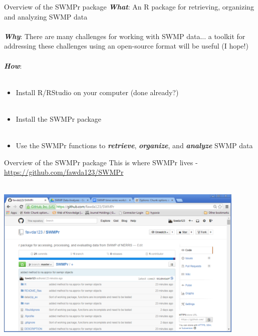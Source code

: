 \documentclass[xcolor=svgnames]{beamer}\usepackage[]{graphicx}\usepackage[]{color}
\newcommand{\Bigtxt}[1]{\textbf{\textit{#1}}}
\begin{document}
\begin{frame}{Overview of the SWMPr package}
\onslide<+->
\textbf{\emph{What}}: An R package for retrieving, organizing and analyzing SWMP data \\~\\
\onslide<+->
\Bigtxt{Why}: There are many challenges for working with SWMP data... a toolkit for addressing these challenges using an open-source format will be useful (I hope!) \\~\\
\onslide<+->
\Bigtxt{How}: \\~\\
\begin{itemize}
\item Install R/RStudio on your computer (done already?) \\~\\
\item Install the SWMPr package \\~\\
\item Use the SWMPr functions to \Bigtxt{retrieve}, \Bigtxt{organize}, and \Bigtxt{analyze} SWMP data 
\end{itemize}
\end{frame}

\begin{frame}{Overview of the SWMPr package}
This is where SWMPr lives - \href{https://github.com/fawda123/SWMPr}{https://github.com/fawda123/SWMPr}\\~\\
\centerline{\includegraphics[width = 0.9\textwidth]{swmpr_github.png}}
\end{frame}
\end{document}
